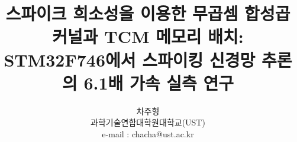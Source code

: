 \documentclass[preprint]{IEIE} %
\title{스파이크 희소성을 이용한 무곱셈 합성곱 커널과 TCM 메모리 배치:\\STM32F746에서 스파이킹 신경망 추론의 6.1배 가속 실측 연구}
\author{차주형 \\ 과학기술연합대학원대학교(UST) \\ e-mail : chacha@ust.ac.kr}
\begin{document}
\maketitle
\makeabstract














{\footnotesize

}
\end{document}
